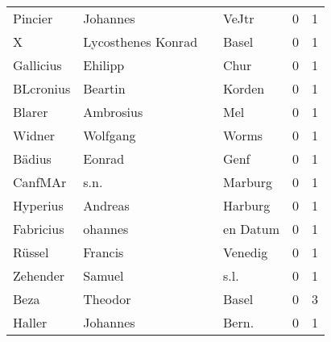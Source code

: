 \begin{center}
\begin{tiny}
\begin{longtabu}{llllrr}
                  Pincier &                           Johannes &             &                                       VeJtr &          0 &         1 \\
                        X &                 Lycosthenes Konrad &             &                                       Basel &          0 &         1 \\
                Gallicius &                            Ehilipp &             &                                        Chur &          0 &         1 \\
                BLcronius &                            Beartin &             &                                      Korden &          0 &         1 \\
                   Blarer &                          Ambrosius &             &                                         Mel &          0 &         1 \\
                   Widner &                           Wolfgang &             &                                       Worms &          0 &         1 \\
                   Bädius &                             Eonrad &             &                                        Genf &          0 &         1 \\
                  CanfMAr &                               s.n. &             &                                     Marburg &          0 &         1 \\
                 Hyperius &                            Andreas &             &                                     Harburg &          0 &         1 \\
                Fabricius &                            ohannes &             &                                    en Datum &          0 &         1 \\
                   Rüssel &                            Francis &             &                                     Venedig &          0 &         1 \\
                 Zehender &                             Samuel &             &                                        s.l. &          0 &         1 \\
                     Beza &                            Theodor &             &                                       Basel &          0 &         3 \\
                   Haller &                           Johannes &             &                                      Bern.  &          0 &         1 \\

\end{longtabu}
\end{tiny}
\end{center}
